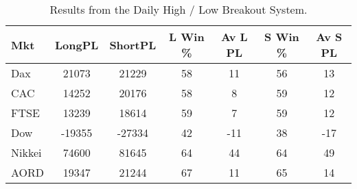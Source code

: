 \begin{table}[ht]
\centering
\caption[Results from the Daily High / Low Breakout System]{Results from the Daily High / Low Breakout System.} 
\label{tab:hl_bout_sys}
\begin{tabular}{lcccccc}
  \toprule Mkt & LongPL & ShortPL & L Win \% & Av L PL & S Win \% & Av S PL \\ 
  \midrule Dax & 21073 & 21229 & 58 & 11 & 56 & 13 \\ 
  CAC & 14252 & 20176 & 58 & 8 & 59 & 12 \\ 
  FTSE & 13239 & 18614 & 59 & 7 & 59 & 12 \\ 
  Dow & -19355 & -27334 & 42 & -11 & 38 & -17 \\ 
  Nikkei & 74600 & 81645 & 64 & 44 & 64 & 49 \\ 
  AORD & 19347 & 21244 & 67 & 11 & 65 & 14 \\ 
   \bottomrule \end{tabular}
\end{table}
